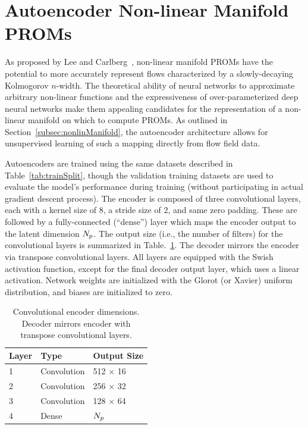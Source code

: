 \section{Autoencoder Non-linear Manifold PROMs}\label{sec:flameNonlin}

As proposed by Lee and Carlberg~\cite{Lee2020}, non-linear manifold PROMs have the potential to more accurately represent flows characterized by a slowly-decaying Kolmogorov $n$-width. The theoretical ability of neural networks to approximate arbitrary non-linear functions and the expressiveness of over-parameterized deep neural networks make them appealing candidates for the representation of a non-linear manifold on which to compute PROMs. As outlined in Section~\ref{subsec:nonlinManifold}, the autoencoder architecture allows for unsupervised learning of such a mapping directly from flow field data.

Autoencoders are trained using the same datasets described in Table~\ref{tab:trainSplit}, though the validation training datasets are used to evaluate the model's performance during training (without participating in actual gradient descent process). The encoder is composed of three convolutional layers, each with a kernel size of 8, a stride size of 2, and same zero padding. These are followed by a fully-connected (``dense'') layer which maps the encoder output to the latent dimension $N_p$. The output size (i.e., the number of filters) for the convolutional layers is summarized in Table.~\ref{tab:caeArch}. The decoder mirrors the encoder via transpose convolutional layers. All layers are equipped with the Swish activation function, except for the final decoder output layer, which uses a linear activation. Network weights are initialized with the Glorot (or Xavier) uniform distribution, and biases are initialized to zero.

\begin{table}
	\centering
	\begin{tabular}{ lll }
	\toprule
	Layer & Type & Output Size  \\
	\midrule
	1 & Convolution & 512 $\times$ 16 \\
    2 & Convolution & 256 $\times$ 32 \\
    3 & Convolution & 128 $\times$ 64 \\
    4 & Dense & $N_p$ \\
	\bottomrule
	\end{tabular}
	\caption{\label{tab:caeArch}Convolutional encoder dimensions. Decoder mirrors encoder with transpose convolutional layers.}
\end{table}


